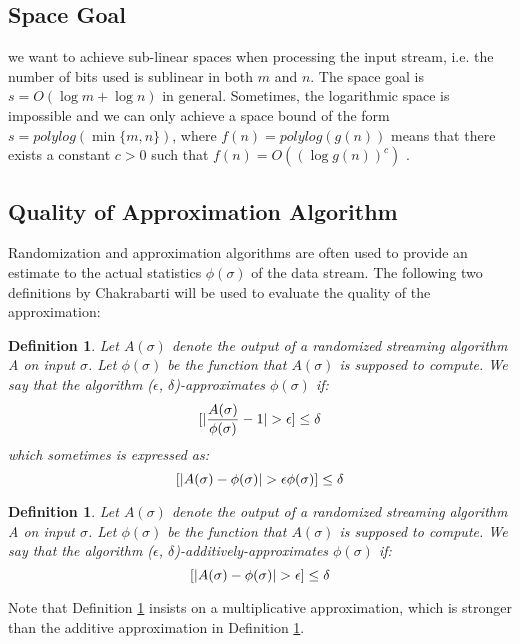 \documentclass[11pt]{article}
\theoremstyle{plain}
\newtheorem{definition}[theorem]{Definition}
\let\Pr\relax
\DeclareMathOperator*{\Pr}{\mathbb{P}}
\begin{document}
\subsection{Space Goal} 

we want to achieve sub-linear spaces when 
processing the input stream, i.e. the number of bits used is sublinear in both 
$m$ and $n$. The space goal is $s=O(\log m + \log n)$ in general. 
Sometimes, the logarithmic space is impossible and we can only achieve
a space bound of the form $s = polylog(\min\{m, n\})$, where $f(n) = 
polylog(g(n))$ means that there exists a constant $c > 0$ such that $f (n) = 
O((\log g(n))^c)$  \cite{Cha2015-notes}.

\subsection{Quality of Approximation Algorithm}

 Randomization and 
approximation algorithms are often used to provide an estimate to the actual 
statistics $\phi(\sigma)$ of the data stream. The following two definitions by 
Chakrabarti will be used to evaluate the quality of the approximation:

\begin{definition}
\label{def:approximation}
		Let $A(\sigma)$ denote the output of a randomized streaming algorithm 
		A on input $\sigma$. Let $\phi(\sigma)$ be the function that 
		$A(\sigma)$ is supposed to compute. We say that the algorithm 
		($\epsilon$, $\delta$)-approximates  $\phi(\sigma)$ if:
		\[
		\Pr[|\frac{A(\sigma)}{\phi(\sigma)} - 1|>\epsilon]\leq \delta
		\]
		which sometimes is expressed as:
		\[
		\Pr[|A(\sigma)-\phi(\sigma)|>\epsilon\phi(\sigma)]\leq \delta
		\]
\end{definition}

\begin{definition}
\label{def:approximation-add}
	Let $A(\sigma)$ denote the output of a randomized streaming algorithm 
	A on input $\sigma$. Let $\phi(\sigma)$ be the function that $A(\sigma)$ 
	is supposed to compute. We say that the algorithm ($\epsilon$, 
	$\delta$)-additively-approximates  $\phi(\sigma)$ if:
	\[
	\Pr[|A(\sigma)-\phi(\sigma)|>\epsilon]\leq \delta
	\]
\end{definition}

Note that Definition  \ref{def:approximation} insists on a multiplicative 
approximation, which is stronger than the additive approximation in 
Definition  \ref{def:approximation-add}.
\end{document}
